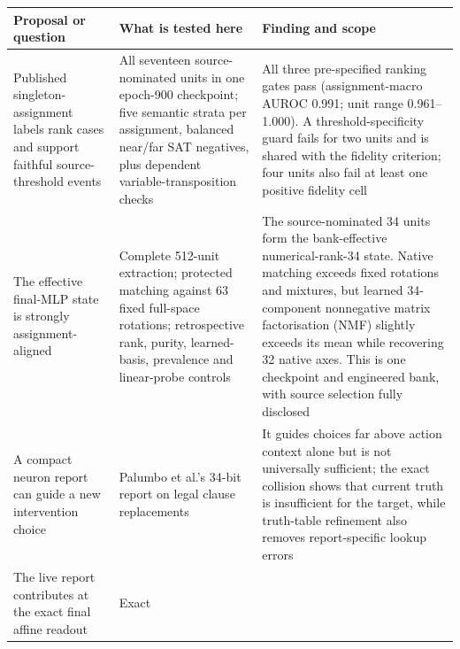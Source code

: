 \documentclass[
  british,
  11pt,
  a4paper,
]{article}
\newcounter{none} %
\begin{document}
{\def\LTcaptype{none} %
\begin{longtable}[]{@{}
  >{\raggedright\arraybackslash}p{}
  >{\raggedright\arraybackslash}p{}
  >{\raggedright\arraybackslash}p{}@{}}
\toprule\noalign{}
\begin{minipage}[b]{\linewidth}\raggedright
Proposal or question
\end{minipage} & \begin{minipage}[b]{\linewidth}\raggedright
What is tested here
\end{minipage} & \begin{minipage}[b]{\linewidth}\raggedright
Finding and scope
\end{minipage} \\
\midrule\noalign{}
\endhead
\bottomrule\noalign{}
\endlastfoot
Published singleton-assignment labels rank cases and support faithful
source-threshold events & All seventeen source-nominated units in one
epoch-900 checkpoint; five semantic strata per assignment, balanced
near/far SAT negatives, plus dependent variable-transposition checks &
All three pre-specified ranking gates pass (assignment-macro AUROC
0.991; unit range 0.961--1.000). A threshold-specificity guard fails for
two units and is shared with the fidelity criterion; four units also
fail at least one positive fidelity cell \\
The effective final-MLP state is strongly assignment-aligned & Complete
512-unit extraction; protected matching against 63 fixed full-space
rotations; retrospective rank, purity, learned-basis, prevalence and
linear-probe controls & The source-nominated 34 units form the
bank-effective numerical-rank-34 state. Native matching exceeds fixed
rotations and mixtures, but learned 34-component nonnegative matrix
factorisation (NMF) slightly exceeds its mean while recovering 32 native
axes. This is one checkpoint and engineered bank, with source selection
fully disclosed \\
A compact neuron report can guide a new intervention choice & Palumbo et
al.'s 34-bit report on legal clause replacements & It guides choices far
above action context alone but is not universally sufficient; the exact
collision shows that current truth is insufficient for the target, while
truth-table refinement also removes report-specific lookup errors \\
The live report contributes at the exact final affine readout & Exact

\end{longtable}}
\end{document}
